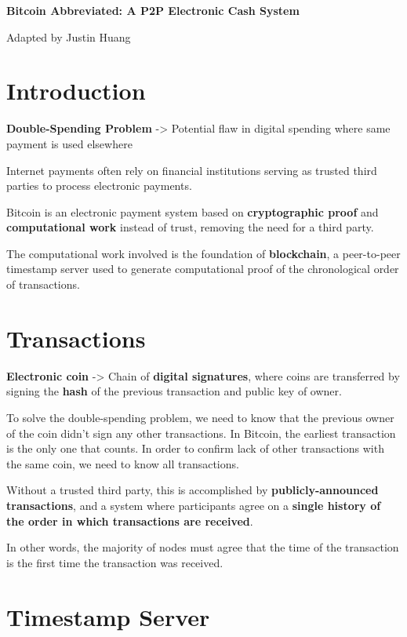 \documentclass[11pt, letterpaper]{template}
\begin{document}
{\LARGE\bfseries Bitcoin Abbreviated: A P2P Electronic Cash System \par}

Adapted by Justin Huang

\section{Introduction}

\textbf{Double-Spending Problem} -> Potential flaw in digital spending where same payment is used elsewhere

Internet payments often rely on financial institutions serving as trusted third parties to process electronic payments.

Bitcoin is an electronic payment system based on \textbf{cryptographic proof} and \textbf{computational work} instead of trust, removing the need for a third party. 

The computational work involved is the foundation of \textbf{blockchain}, a peer-to-peer timestamp server used to generate computational proof of the chronological order of transactions.

\section{Transactions}

\textbf{Electronic coin} -> Chain of \textbf{digital signatures}, where coins are transferred by signing the \textbf{hash} of the previous transaction and public key of owner.

To solve the double-spending problem, we need to know that the previous owner of the coin didn't sign any other transactions. In Bitcoin, the earliest transaction is the only one that counts. In order to confirm lack of other transactions with the same coin, we need to know all transactions. 

Without a trusted third party, this is accomplished by \textbf{publicly-announced transactions}, and a system where participants agree on a \textbf{single history of the order in which transactions are received}. 

In other words, the majority of nodes must agree that the time of the transaction is the first time the transaction was received.

\section{Timestamp Server}
\end{document}
